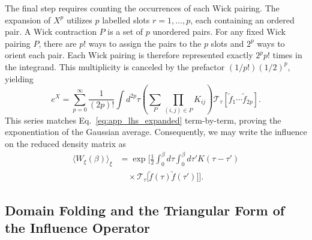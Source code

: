The final step requires counting the occurrences of each Wick pairing. The expansion of $X^p$ utilizes $p$ labelled slots $r=1, \dots, p$, each containing an ordered pair. A Wick contraction $P$ is a set of $p$ unordered pairs. For any fixed Wick pairing $P$, there are $p!$ ways to assign the pairs to the $p$ slots and $2^p$ ways to orient each pair. Each Wick pairing is therefore represented exactly $2^p p!$ times in the integrand. This multiplicity is canceled by the prefactor $(1/p!) (1/2)^p$, yielding
\begin{equation}
    e^X = \sum_{p=0}^\infty \frac{1}{(2p)!} \int d^{2p}\tau \left( \sum_P \prod_{(i,j) \in P} K_{ij} \right) \mathcal{T}_\tau \left[ \tilde{f}_1 \cdots \tilde{f}_{2p} \right].
\end{equation}
This series matches Eq.~\eqref{eq:app_lhs_expanded} term-by-term, proving the exponentiation of the Gaussian average. Consequently, we may write the influence on the reduced density matrix as
\begin{equation}
    \begin{split}
        \langle W_\xi(\beta)\rangle_\xi &= \exp\bigg[\frac12\int_0^\beta d\tau\int_0^\beta d\tau' K(\tau-\tau') \\
        &\quad \times \mathcal T_\tau\!\big[\tilde f(\tau)\tilde f(\tau')\big]\bigg].
    \end{split}
    \label{eq:Wbar_cumulant_T}
\end{equation}

\subsection*{Domain Folding and the Triangular Form of the Influence Operator}
\label{app:triangular_folding}

